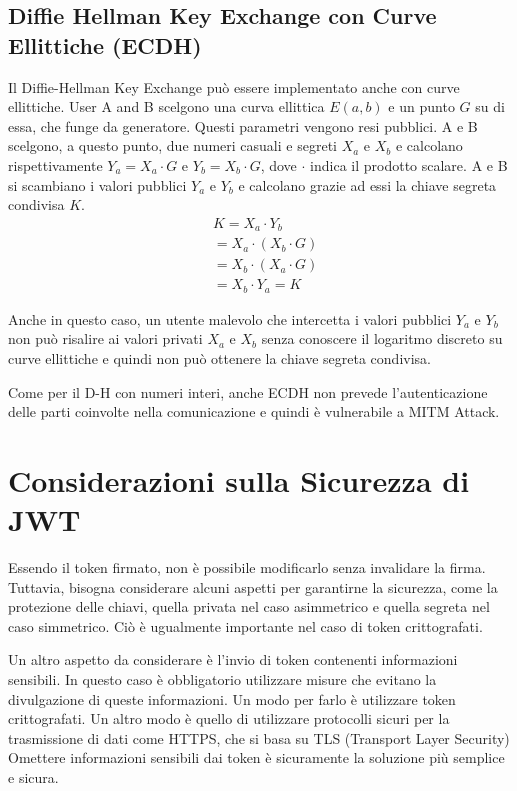 \documentclass{article}
\begin{document}
\subsection{Diffie Hellman Key Exchange con Curve Ellittiche (ECDH)}
Il Diffie-Hellman Key Exchange può essere implementato anche con curve ellittiche.
User A and B scelgono una curva ellittica $E(a,b)$ e un punto $G$ su di essa, che funge da generatore. Questi parametri vengono resi pubblici.
A e B scelgono, a questo punto, due numeri casuali e segreti $X_a$ e $X_b$ e calcolano rispettivamente $Y_a = X_a \cdot G$ e $Y_b = X_b \cdot G$, dove $\cdot$ indica il prodotto scalare.
A e B si scambiano i valori pubblici $Y_a$ e $Y_b$ e calcolano grazie ad essi la chiave segreta condivisa $K$.
\begin{equation}
	\begin{aligned}
		&K = X_a \cdot Y_b\\
		&= X_a \cdot (X_b \cdot G)\\
		&= X_b \cdot (X_a \cdot G)\\
		&= X_b \cdot Y_a = K
	\end{aligned}
\end{equation}

Anche in questo caso, un utente malevolo che intercetta i valori pubblici $Y_a$ e $Y_b$ non può risalire ai valori privati $X_a$ e $X_b$ senza conoscere il logaritmo discreto su curve ellittiche e quindi non può ottenere la chiave segreta condivisa.

Come per il D-H con numeri interi, anche ECDH non prevede l'autenticazione delle parti coinvolte nella comunicazione e quindi è vulnerabile a MITM Attack.


\section{Considerazioni sulla Sicurezza di JWT}
Essendo il token firmato, non è possibile modificarlo senza invalidare la firma.
Tuttavia, bisogna considerare alcuni aspetti per garantirne la sicurezza, come la protezione delle chiavi, quella privata nel caso asimmetrico e quella segreta nel caso simmetrico.
Ciò è ugualmente importante nel caso di token crittografati.

Un altro aspetto da considerare è l'invio di token contenenti informazioni sensibili.
In questo caso è obbligatorio utilizzare misure che evitano la divulgazione di queste informazioni.
Un modo per farlo è utilizzare token crittografati.
Un altro modo è quello di utilizzare protocolli sicuri per la trasmissione di dati come HTTPS, che si basa su TLS (Transport Layer Security)
Omettere informazioni sensibili dai token è sicuramente la soluzione più semplice e sicura.
\end{document}
